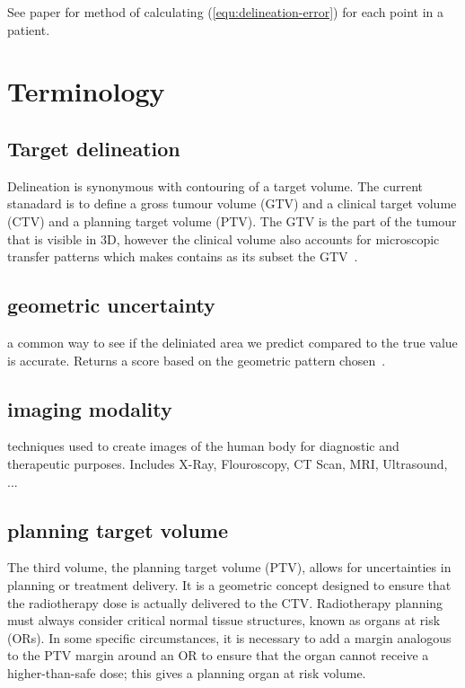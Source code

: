 \documentclass[11pt]{article}
\begin{document}
See paper for method of calculating (\ref{equ:delineation-error}) for each point in a patient.

\section{Terminology}

\subsection{Target delineation} \label{term:target-delineation}

Delineation is synonymous with contouring of a target volume. The current stanadard is to define a gross tumour volume (GTV) and a clinical target volume (CTV) and a planning target volume (PTV). The GTV is the part of the tumour that is visible in 3D, however the clinical volume also accounts for microscopic transfer patterns which makes contains as its subset the GTV~\cite{tumor-delineation}.

\subsection{geometric uncertainty} \label{term:geometric-uncertainty}

a common way to see if the deliniated area we predict compared to the true value is accurate. Returns a score based on the geometric pattern chosen~\cite{review-metrics}.

\subsection{imaging modality} \label{term:imaging-modality}

techniques used to create images of the human body for diagnostic and therapeutic purposes. Includes X-Ray, Flouroscopy, CT Scan, MRI, Ultrasound, ...~\cite{imaging-modality}

\subsection{planning target volume} \label{term:planning-target-volume}

The third volume, the planning target volume (PTV), allows for uncertainties in planning or treatment delivery. It is a geometric concept designed to ensure that the radiotherapy dose is actually delivered to the CTV. Radiotherapy planning must always consider critical normal tissue structures, known as organs at risk (ORs). In some specific circumstances, it is necessary to add a margin analogous to the PTV margin around an OR to ensure that the organ cannot receive a higher-than-safe dose; this gives a planning organ at risk volume.~\cite{defining-target-volumes}

\printbibliography
\end{document}
